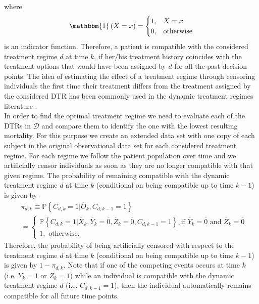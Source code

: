 \documentclass[12pt]{article}
\begin{document}
where
\begin{equation*}
\mathbbm{1} \left( X = x \right) = 
\begin{cases}
 1,   & X=x\\
 0,  & \text{otherwise}
\end{cases}
\end{equation*}
is an indicator function. Therefore, a patient is compatible with the considered treatment regime $d$ at time $k$, if her/his treatment history coincides with the treatment options that would have been assigned by $d$ for all the past decision points. The idea of estimating the effect of a treatment regime through censoring individuals the first time their treatment differs from the treatment assigned by the considered DTR has been commonly used in the dynamic treatment regimes literature \citep{Robins1993, Murphy2001, VanderLaan2007, Orellana2010, Cain2010, Chakraborty2013,Tsiatis2020}.
\\
\indent
In order to find the optimal treatment regime we need to evaluate each of the DTRs in $\mathcal{D}$ and compare them to identify the one with the lowest resulting mortality.  For this purpose we create an extended data set with one copy of each subject in the original observational data set for each considered treatment regime. For each regime we follow the patient population over time and we artificially censor individuals as soon as they are no longer compatible with that given regime. The probability of remaining compatible with the dynamic treatment regime $d$ at time $k$ (conditional on being compatible up to time $k-1$) is given by 
\begin{align}
\label{eqn5}
\nonumber
&\pi_{d,k} \equiv \mathbb{P} \left\lbrace C_{d,k} = 1 \vert \overline{O}_k, C_{d,k-1} = 1 \right\rbrace \\
&=
\begin{cases}
\mathbb{P} \left\lbrace C_{d,k} = 1 \vert \overline{X}_k,  \overline{Y}_k = \overline{0}, \overline{Z}_k = \overline{0}, C_{d,k-1} = 1 \right\rbrace, \text{if } \overline{Y}_k = \overline{0} \text{ and } \overline{Z}_k = \overline{0} \\
1, \text{ otherwise.}
\end{cases}
\end{align}
Therefore, the probability of being artificially censored with respect to the treatment regime $d$ at time $k$ (conditional on being compatible up to time $k-1$) is given by $1 - \pi_{d,k}$.  Note that if one of the competing events occurs at time $k$ (i.e. $Y_k=1$ or $Z_k=1$) while an individual is compatible with the dynamic treatment regime $d$ (i.e. $C_{d,k-1} = 1$), then the individual automatically remains compatible for all future time points. 
\end{document}
